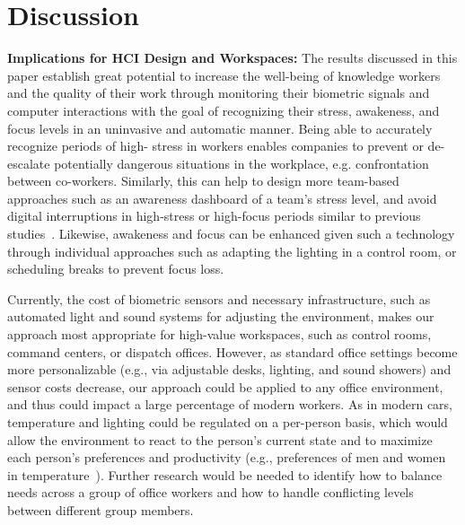 \section{Discussion}
\noindent
\textbf{Implications for HCI Design and Workspaces:}
The results discussed in this paper establish great potential
to increase the well-being of knowledge workers and the quality of their work
through monitoring their biometric signals and computer interactions with the
goal of recognizing their stress, awakeness, and focus levels in an uninvasive 
and automatic manner. Being able to accurately recognize periods of high-
stress in workers enables companies to prevent or de-escalate potentially 
dangerous situations in the workplace, e.g. confrontation between co-workers. Similarly, this can help to design more team-based approaches such as an 
awareness dashboard of a team's stress level, and avoid digital interruptions in high-stress or high-focus periods similar to previous studies~\cite{zuger2017reducing}.
Likewise, awakeness and focus
can be enhanced given such a technology
through individual approaches such as adapting the lighting in a control 
room, or scheduling breaks to prevent focus loss.

Currently, the cost of biometric sensors and necessary infrastructure, such as automated light and sound systems for adjusting the environment, makes our approach most appropriate for high-value workspaces, such as control rooms, command centers, or dispatch offices. However, as standard office settings become more personalizable (e.g., via adjustable desks, lighting, and sound showers) and sensor costs decrease, our approach could be applied to any office environment, and thus could impact a large percentage of modern workers. As in modern cars, temperature and lighting could be regulated on a per-person basis, which would allow the environment to react to the person's current state and to maximize each person's preferences and productivity (e.g., preferences of men and women in temperature~\cite{Karjalainen07}). Further research would be needed to identify how to balance needs across a group of office workers and how to handle conflicting levels between different group members.

